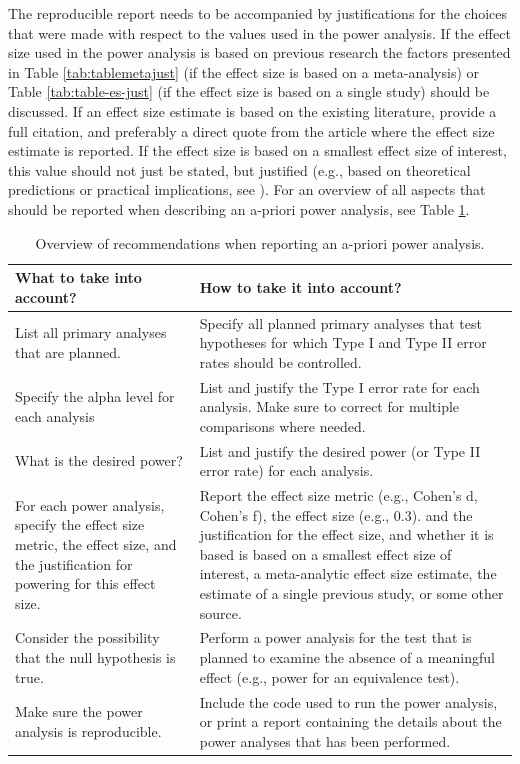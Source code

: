 \documentclass[
  oneside]{book}
\begin{document}
The reproducible report needs to be accompanied by justifications for the choices that were made with respect to the values used in the power analysis. If the effect size used in the power analysis is based on previous research the factors presented in Table \ref{tab:tablemetajust} (if the effect size is based on a meta-analysis) or Table \ref{tab:table-es-just} (if the effect size is based on a single study) should be discussed. If an effect size estimate is based on the existing literature, provide a full citation, and preferably a direct quote from the article where the effect size estimate is reported. If the effect size is based on a smallest effect size of interest, this value should not just be stated, but justified (e.g., based on theoretical predictions or practical implications, see \citet{lakens_equivalence_2018}). For an overview of all aspects that should be reported when describing an a-priori power analysis, see Table \ref{tab:table-pow-rec-2}.

\begin{table}

\caption{\label{tab:table-pow-rec-2}Overview of recommendations when reporting an a-priori power analysis.}
\centering
\begin{tabular}[t]{l|l}
\hline
What to take into account? & How to take it into account?\\
\hline
List all primary analyses that are planned. & Specify all planned primary analyses that test hypotheses for which Type I and Type II error rates should be controlled.\\
\hline
Specify the alpha level for each analysis & List and justify the Type I error rate for each analysis. Make sure to correct for multiple comparisons where needed.\\
\hline
What is the desired power? & List and justify the desired power (or Type II error rate) for each analysis.\\
\hline
For each power analysis, specify the effect size metric, the effect size, and the justification for powering for this effect size. & Report the effect size metric (e.g., Cohen's d, Cohen's f), the effect size (e.g., 0.3). and the justification for the effect size, and whether it is based is based on a smallest effect size of interest, a meta-analytic effect size estimate, the estimate of a single previous study, or some other source.\\
\hline
Consider the possibility that the null hypothesis is true. & Perform a power analysis for the test that is planned to examine the absence of a meaningful effect (e.g., power for an equivalence test).\\
\hline
Make sure the power analysis is reproducible. & Include the code used to run the power analysis, or print a report containing the details about the power analyses that has been performed.\\
\hline
\end{tabular}
\end{table}
\end{document}
